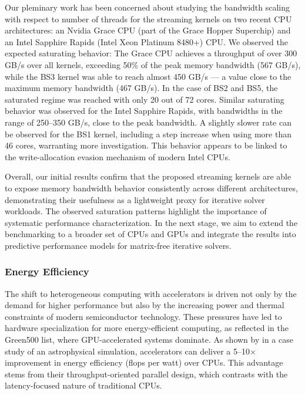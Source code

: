 \documentclass[a4paper,12pt, numbers]{article}
\begin{document}
Our pleminary work has been concerned about studying the bandwidth scaling with respect to number of threads for the streaming kernels on two recent CPU architectures: an Nvidia Grace CPU (part of the Grace Hopper Superchip) and an Intel Sapphire Rapids (Intel Xeon Platinum 8480+) CPU. We observed the expected saturating behavior: The Grace CPU achieves a throughput of over 300 GB/s over all kernels, exceeding 50\% of the peak memory bandwidth (567 GB/s), while the BS3 kernel was able to reach almost 450 GB/s --- a value close to the maximum memory bandwidth (467 GB/s). In the case of BS2 and BS5, the saturated regime was reached with only 20 out of 72 cores. Similar saturating behavior was observed for the Intel Sapphire Rapids, with bandwidths in the range of 250--350 GB/s, close to the peak bandwidth. A slightly slower rate can be observed for the BS1 kernel, including a step increase when using more than 46 cores, warranting more investigation. This behavior appears to be linked to the write-allocation evasion mechanism of modern Intel CPUs.

Overall, our initial results confirm that the proposed streaming kernels are able to expose memory bandwidth behavior consistently across different architectures, demonstrating their usefulness as a lightweight proxy for iterative solver workloads.  The observed saturation patterns highlight the importance of systematic performance characterization. In the next stage, we aim to extend the benchmarking to a broader set of CPUs and GPUs and integrate the results into predictive performance models for matrix-free iterative solvers.



\subsubsection*{Energy Efficiency}

The shift to heterogeneous computing with accelerators is driven not only by the demand for higher performance but also by the increasing power and thermal constraints of modern semiconductor technology. These pressures have led to hardware specialization for more energy-efficient computing, as reflected in the Green500 list, where GPU-accelerated systems dominate. As shown by \cite{Cielo25} in a case study of an astrophysical simulation, accelerators can deliver a 5–10× improvement in energy efficiency (flops per watt) over CPUs. This advantage stems from their throughput-oriented parallel design, which contrasts with the latency-focused nature of traditional CPUs.
\end{document}
